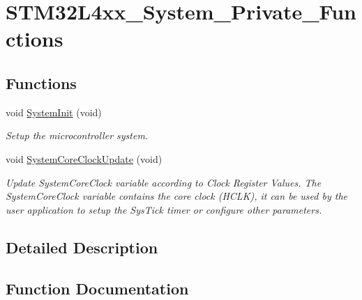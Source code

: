 \hypertarget{group___s_t_m32_l4xx___system___private___functions}{}\section{S\+T\+M32\+L4xx\+\_\+\+System\+\_\+\+Private\+\_\+\+Functions}
\label{group___s_t_m32_l4xx___system___private___functions}
\subsection*{Functions}
\begin{DoxyCompactItemize}
\item 
void \mbox{\hyperlink{group___s_t_m32_l4xx___system___private___functions_ga93f514700ccf00d08dbdcff7f1224eb2}{System\+Init}} (void)
\begin{DoxyCompactList}\small\item\em Setup the microcontroller system. \end{DoxyCompactList}\item 
void \mbox{\hyperlink{group___s_t_m32_l4xx___system___private___functions_gae0c36a9591fe6e9c45ecb21a794f0f0f}{System\+Core\+Clock\+Update}} (void)
\begin{DoxyCompactList}\small\item\em Update System\+Core\+Clock variable according to Clock Register Values. The System\+Core\+Clock variable contains the core clock (H\+C\+LK), it can be used by the user application to setup the Sys\+Tick timer or configure other parameters. \end{DoxyCompactList}\end{DoxyCompactItemize}


\subsection{Detailed Description}


\subsection{Function Documentation}
\mbox{\label{group___s_t_m32_l4xx___system___private___functions_gae0c36a9591fe6e9c45ecb21a794f0f0f}} 
